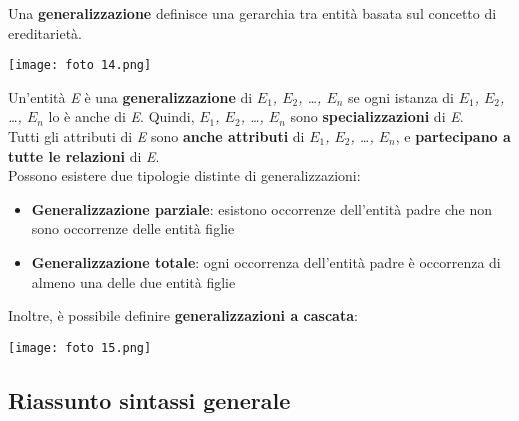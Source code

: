 \documentclass{article}
\begin{document}
Una \textbf{generalizzazione} definisce una gerarchia tra entità basata sul concetto di ereditarietà.
\begin{center}
    \texttt{[image: foto 14.png]}
\end{center}
Un'entità \textit{E} è una \textbf{generalizzazione} di \textit{$E_1$, $E_2$, \dots, $E_n$} se ogni istanza di \textit{$E_1$, $E_2$, \dots, $E_n$} lo è anche di \textit{E}. Quindi, \textit{$E_1$, $E_2$, \dots, $E_n$} sono \textbf{specializzazioni} di \textit{E}.\\
Tutti gli attributi di \textit{E} sono \textbf{anche attributi} di \textit{$E_1$, $E_2$, \dots, $E_n$}, e \textbf{partecipano a tutte le relazioni} di \textit{E}.\vspace*{14pt}\\
Possono esistere due tipologie distinte di generalizzazioni:
\begin{itemize}[label={-}, leftmargin=1cm]
    \item \textbf{Generalizzazione parziale}: esistono occorrenze dell'entità padre che non sono occorrenze delle entità figlie
    \item \textbf{Generalizzazione totale}: ogni occorrenza dell'entità padre è occorrenza di almeno una delle due entità figlie\vspace*{20pt}\\
\end{itemize}
Inoltre, è possibile definire \textbf{generalizzazioni a cascata}:
\begin{center}
    \texttt{[image: foto 15.png]}\vspace{14pt}\\
\end{center}

\subsection*{Riassunto sintassi generale}
\large
\end{document}
